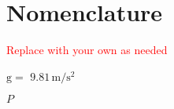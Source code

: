 \chapter{Nomenclature}
\textcolor{red}{Replace with your own as needed}
\begin{Nomencl}
   \item[$\mathrm{g} = $] $\mathrm{9.81\,m/s^2}$

   \item[$P$]



\end{Nomencl}


\endinput
